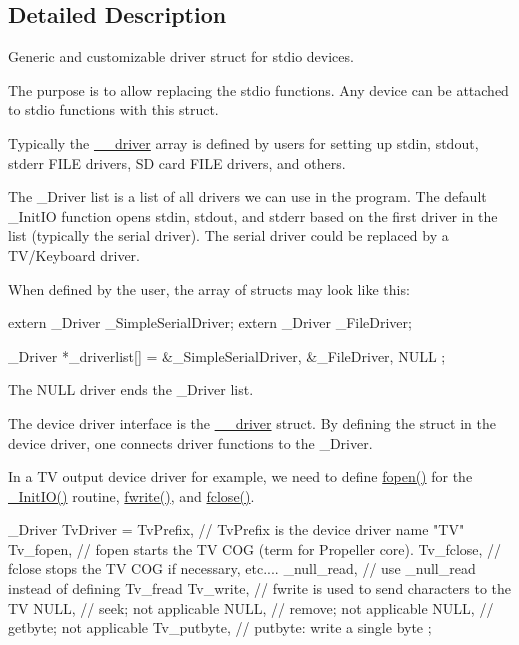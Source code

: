 \subsection{Detailed Description}
Generic and customizable driver struct for stdio devices. 

The purpose is to allow replacing the stdio functions. Any device can be attached to stdio functions with this struct.

Typically the \mbox{\hyperlink{struct____driver}{\+\_\+\+\_\+driver}} array is defined by users for setting up stdin, stdout, stderr F\+I\+LE drivers, SD card F\+I\+LE drivers, and others.

The \+\_\+\+Driver list is a list of all drivers we can use in the program. The default \+\_\+\+Init\+IO function opens stdin, stdout, and stderr based on the first driver in the list (typically the serial driver). The serial driver could be replaced by a T\+V/\+Keyboard driver.

When defined by the user, the array of structs may look like this\+: \begin{DoxyVerb}extern _Driver _SimpleSerialDriver;
extern _Driver _FileDriver;

_Driver *_driverlist[] = {
  &_SimpleSerialDriver,
  &_FileDriver,
  NULL
};\end{DoxyVerb}
 The N\+U\+LL driver ends the \+\_\+\+Driver list.

The device driver interface is the \mbox{\hyperlink{struct____driver}{\+\_\+\+\_\+driver}} struct. By defining the struct in the device driver, one connects driver functions to the \+\_\+\+Driver.

In a TV output device driver for example, we need to define \mbox{\hyperlink{struct____driver_aff96f49764bd6d991e204f1e3cd0adfd}{fopen()}} for the \mbox{\hyperlink{driver_8h_adbf07ea45760d1ad007a2c7be8102336}{\+\_\+\+Init\+I\+O()}} routine, \mbox{\hyperlink{stdio_8h_a9de5969c36eab7f18a1966d6d43aba78}{fwrite()}}, and \mbox{\hyperlink{struct____driver_a31af02555db35d9f4f4f8c63614fee62}{fclose()}}.

\begin{DoxyVerb}_Driver TvDriver = {
  TvPrefix,     // TvPrefix is the device driver name "TV"
  Tv_fopen,     // fopen starts the TV COG (term for Propeller core).
  Tv_fclose,    // fclose stops the TV COG if necessary, etc....
  _null_read,   // use _null_read instead of defining Tv_fread
  Tv_write,     // fwrite is used to send characters to the TV
  NULL,         // seek; not applicable
  NULL,         // remove; not applicable
  NULL,         // getbyte; not applicable
  Tv_putbyte,   // putbyte: write a single byte
};\end{DoxyVerb}


